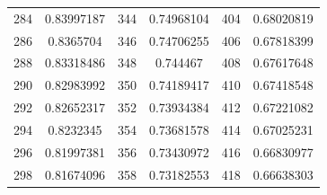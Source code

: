 \documentclass[
	12pt,				%
	openright,			%
	twoside,			%
	a4paper,			%
	english,			%
	french,				%
	spanish,			%
	brazil,				%
	]{abntex2}
\begin{document}
\begin{apendicesenv}
\begin{table}[H]
\begin{tabular}{c c| c c | c c}
284 & 0.83997187 & 344 & 0.74968104 & 404 & 0.68020819\\
286 & 0.8365704 & 346 & 0.74706255 & 406 & 0.67818399\\
288 & 0.83318486 & 348 & 0.744467 & 408 & 0.67617648\\
290 & 0.82983992 & 350 & 0.74189417 & 410 & 0.67418548\\
292 & 0.82652317 & 352 & 0.73934384 & 412 & 0.67221082\\
294 & 0.8232345 & 354 & 0.73681578 & 414 & 0.67025231\\
296 & 0.81997381 & 356 & 0.73430972 & 416 & 0.66830977\\
298 & 0.81674096 & 358 & 0.73182553 & 418 & 0.66638303
\end{tabular}
\end{table}


\end{apendicesenv}
\end{document}

